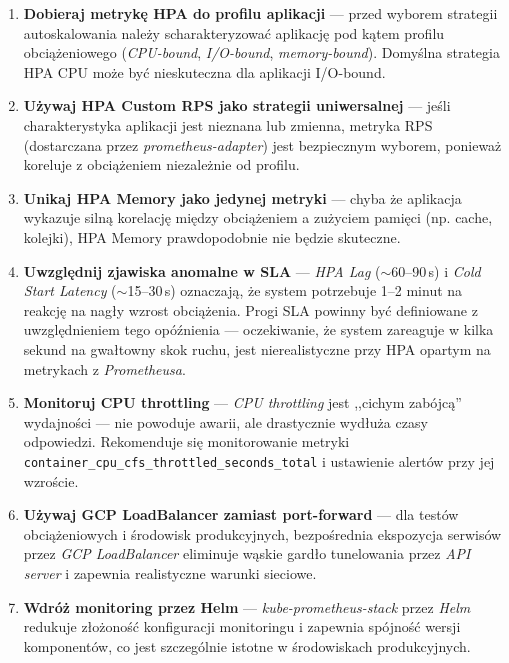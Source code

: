 \begin{enumerate}
  \item \textbf{Dobieraj metrykę HPA do profilu aplikacji} — przed wyborem strategii autoskalowania należy scharakteryzować aplikację pod kątem profilu obciążeniowego (\textit{CPU-bound}, \textit{I/O-bound}, \textit{memory-bound}). Domyślna strategia HPA CPU może być nieskuteczna dla aplikacji I/O-bound.

  \item \textbf{Używaj HPA Custom RPS jako strategii uniwersalnej} — jeśli charakterystyka aplikacji jest nieznana lub zmienna, metryka RPS (dostarczana przez \textit{prometheus-adapter}) jest bezpiecznym wyborem, ponieważ koreluje z obciążeniem niezależnie od profilu.

  \item \textbf{Unikaj HPA Memory jako jedynej metryki} — chyba że aplikacja wykazuje silną korelację między obciążeniem a zużyciem pamięci (np. cache, kolejki), HPA Memory prawdopodobnie nie będzie skuteczne.

  \item \textbf{Uwzględnij zjawiska anomalne w SLA} — \textit{HPA Lag} ($\sim$60--90\,s) i \textit{Cold Start Latency} ($\sim$15--30\,s) oznaczają, że system potrzebuje 1--2 minut na reakcję na nagły wzrost obciążenia. Progi SLA powinny być definiowane z uwzględnieniem tego opóźnienia — oczekiwanie, że system zareaguje w kilka sekund na gwałtowny skok ruchu, jest nierealistyczne przy HPA opartym na metrykach z \textit{Prometheusa}.

  \item \textbf{Monitoruj CPU throttling} — \textit{CPU throttling} jest ,,cichym zabójcą'' wydajności — nie powoduje awarii, ale drastycznie wydłuża czasy odpowiedzi. Rekomenduje się monitorowanie metryki \texttt{container\_cpu\_cfs\_throttled\_seconds\_total} i ustawienie alertów przy jej wzroście.

  \item \textbf{Używaj GCP LoadBalancer zamiast port-forward} — dla testów obciążeniowych i środowisk produkcyjnych, bezpośrednia ekspozycja serwisów przez \textit{GCP LoadBalancer} eliminuje wąskie gardło tunelowania przez \textit{API server} i zapewnia realistyczne warunki sieciowe.

  \item \textbf{Wdróż monitoring przez Helm} — \textit{kube-prometheus-stack} przez \textit{Helm} redukuje złożoność konfiguracji monitoringu i zapewnia spójność wersji komponentów, co jest szczególnie istotne w środowiskach produkcyjnych.
\end{enumerate}


